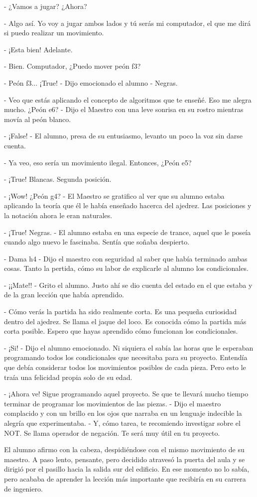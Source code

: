 \documentclass[12pt, letterpaper]{article}
\begin{document}
- ¿Vamos a jugar? ¿Ahora?

- Algo así. Yo voy a jugar ambos lados y  tú serás mi computador, el que me dirá si puedo realizar un movimiento.

- ¡Esta bien! Adelante. 

- Bien. Computador, ¿Puedo mover peón f3?

- Peón f3... ¡True! - Dijo emocionado el alumno - Negras. 

- Veo que estás aplicando el concepto de algoritmos que te enseñé. Eso me alegra mucho. ¿Peón e6? - Dijo el Maestro
con una leve sonrisa en su rostro mientras movía al peón blanco.

- ¡False! - El alumno, presa de su entusiasmo, levanto un poco la voz sin darse cuenta. 

- Ya veo, eso sería un movimiento ilegal. Entonces, ¿Peón e5?

- ¡True! Blancas. Segunda posición.

- ¡Wow! ¿Peón g4? - El Maestro se gratifico al ver que su alumno estaba aplicando la teoría que él le había enseñado
hacerca del ajedrez. Las posiciones y la notación ahora le eran naturales. 

- ¡True! Negras. - El alumno estaba en una especie de trance, aquel que le poseía cuando algo nuevo le fascinaba. 
Sentía que soñaba despierto. 

- Dama h4 - Dijo el maestro con seguridad al saber que había terminado ambas cosas. Tanto la pertida, cómo su labor de
explicarle al alumno los condicionales.

- ¡¡Mate!! - Grito el alumno. Justo ahí se dio cuenta del estado en el que estaba y de la gran lección que había aprendido.

- Cómo verás la partida ha sido realmente corta. Es una pequeña curiosidad dentro del ajedrez. Se llama el jaque del loco.
Es conocida cómo la partida más corta posible. Espero que hayas aprendido cómo funcionan los condicionales.

- ¡Si! - Dijo el alumno emocionado. Ni siquiera el sabía las horas que le esperaban programando todos los condicionales que 
necesitaba para su proyecto. Entendía que debía considerar todos los movimientos posibles de cada pieza. Pero esto le traía
una felicidad propia solo de su edad. 

- ¡Ahora ve! Sigue programando aquel proyecto. Se que te llevará mucho tiempo terminar de programar los movimientos de las
piezas. - Dijo el maestro complacido y con un brillo en los ojos que narraba en un lenguaje indecible la alegría que 
experimentaba. - Y, cómo tarea, te recomiendo investigar sobre el NOT. Se llama operador de negación. Te será muy útil en tu
proyecto.

El alumno afirmo con la cabeza, despidiéndose con el mismo movimiento de su maestro. A paso lento, pensante, pero decidido
atravesó la puerta del aula y se dirigió por el pasillo hacia la salida sur del edificio. En ese momento no lo sabía, pero 
acababa de aprender la lección más importante que recibiría en su carrera de ingeniero. 
\end{document}
